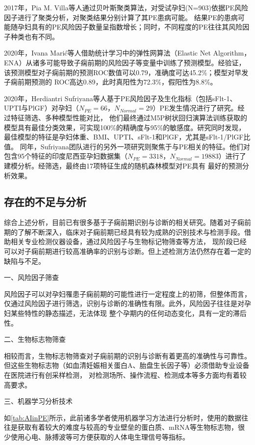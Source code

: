 2017年，Pia M. Villa等人\cite{Villa2017}通过贝叶斯聚类算法，对受试孕妇(N=903)依据PE风险因子进行了聚类分析，对聚类结果分别计算了其PE患病可能。
结果PE的患病可能随孕妇具有的PE风险因子数量呈指数增长；同时，不同程度的PE往往其风险因子种类也有不同。

2020年，Ivana Mari{\'{c}}\cite{Maric2020}等人借助统计学习中的弹性网算法（Elastic Net Algorithm，ENA）从诸多可能导致子痫前期的风险因子等变量中训练了预测模型。经验证，该预测模型对子痫前期的预测ROC数值可以0.79，准确度可达45.2\%；模型对早发子痫前期预测的
ROC高达0.89，此时真阳性为72.3\%，假阳性为8.8\%。

2020年，Herdiantri Sufriyana等人\cite{Sufriyana2020-1}基于PE风险因子及生化指标（包括sFlt-1、UPTI与PlGF）对孕妇（$N_{PE}=66$，$N_{Normal}=29$）PE发生情况进行了研究。经过特征筛选、多种模型性能对比，
他们最终通过M5P树状回归演算法训练获取的模型具有最佳分类效果，可实现100\%的精确度与95\%的敏感度。研究同时发现，最佳模型的特征是孕妇体重、BMI、UPTI、sFlt-1和PlGF，尤其是sFlt-1/PlGF比值。
同年，Sufriyana团队进行的另外一项研究\cite{Sufriyana2020}则聚焦于与PE相关的特征。他们对包含95个特征的印度尼西亚孕妇数据集（$N_{PE}=3318$，$N_{Normal}=19883$）进行了建模分析。经筛选，最终由17项特征生成的随机森林模型对PE具有
最好的预测分析效果。

\subsection{存在的不足与分析}
综合上述分析，目前已有很多基于子痫前期识别与诊断的相关研究。随着对子痫前期的了解不断深入，临床对子痫前期已经具有较为成熟的识别技术与检测手段。借助相关专业检测仪器设备，通过风险因子与生物标记物筛查等方法，
现阶段已经可以对子痫前期进行较高准确率的识别与诊断。但上述检测方法仍然存在着一定的缺陷与不足。

一、风险因子筛查

风险因子可以对孕妇罹患子痫前期的可能性进行一定程度上的初筛，但整体而言，仅通过风险因子进行筛选，识别与诊断的准确性有限。此外，风险因子往往是对孕妇某些特性的静态描述，无法体现
整个孕期内的任何动态变化，具有一定的滞后性。

二、生物标志物筛查

相较而言，生物标志物筛查对子痫前期的识别与诊断有着更高的准确性与可靠性。但这些生物标志物（如血清妊娠相关蛋白A、胎盘生长因子等）必须借助专业设备在医院进行有创采样检测，
对检测场所、操作流程、检测成本等多方面均有着较高要求。

三、机器学习分析技术

如\autoref{tab:AIinPE}所示，此前诸多学者使用机器学习方法进行分析时，使用的数据往往是获取有着较大的难度与较高的专业壁垒的蛋白质、mRNA等生物标志物，很少使用心电、脉搏波等可方便获取的人体电生理信号等指标。

